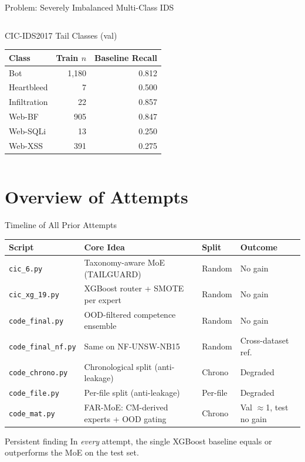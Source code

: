 \documentclass[aspectratio=169,10pt]{beamer}
\newcommand{\bad}[1]{\cellcolor{bad}#1}
\newcommand{\neu}[1]{\cellcolor{neutral}#1}
\begin{document}
\begin{frame}{Problem: Severely Imbalanced Multi-Class IDS}
\begin{columns}[T]
\begin{block}{CIC-IDS2017 Tail Classes (val)}
\begin{tabular}{lrr}
          \toprule
          Class & Train $n$ & Baseline Recall \\
          \midrule
          Bot             & 1{,}180 & 0.812 \\
          Heartbleed      &       7 & 0.500 \\
          Infiltration    &      22 & 0.857 \\
          Web-BF          &     905 & 0.847 \\
          Web-SQLi        &      13 & 0.250 \\
          Web-XSS         &     391 & 0.275 \\
          \bottomrule
        \end{tabular}
      \end{block}
  \end{columns}
\end{frame}

\section{Overview of Attempts}

\begin{frame}{Timeline of All Prior Attempts}
  \footnotesize
  \renewcommand{\arraystretch}{1.3}
  \begin{tabular}{llll}
    \toprule
    \textbf{Script} & \textbf{Core Idea} & \textbf{Split} & \textbf{Outcome} \\
    \midrule
    \texttt{cic\_6.py}        & Taxonomy-aware MoE (TAILGUARD) & Random & \bad{No gain} \\
    \texttt{cic\_xg\_19.py}   & XGBoost router + SMOTE per expert & Random & \bad{No gain} \\
    \texttt{code\_final.py}   & OOD-filtered competence ensemble  & Random & \bad{No gain} \\
    \texttt{code\_final\_nf.py} & Same on NF-UNSW-NB15            & Random & \neu{Cross-dataset ref.} \\
    \texttt{code\_chrono.py}  & Chronological split (anti-leakage) & Chrono & \bad{Degraded} \\
    \texttt{code\_file.py}    & Per-file split (anti-leakage) & Per-file & \bad{Degraded} \\
    \texttt{code\_mat.py}     & FAR-MoE: CM-derived experts + OOD gating & Chrono & \bad{Val $\approx$1, test no gain} \\
    \bottomrule
  \end{tabular}
  \vspace{8pt}
  \begin{alertblock}{Persistent finding}
    In \emph{every} attempt, the single XGBoost baseline equals or outperforms
    the MoE on the test set.
  \end{alertblock}
\end{frame}
\end{document}
